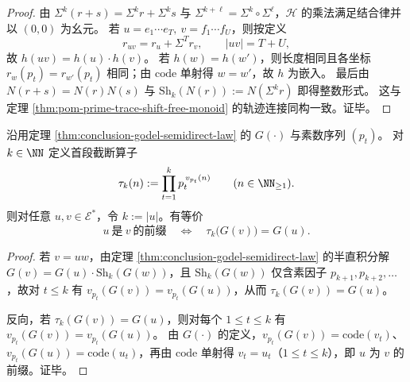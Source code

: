\begin{proof}
由 \(\Sigma^k(r+s)=\Sigma^k r+\Sigma^k s\) 与 \(\Sigma^{k+\ell}=\Sigma^k\circ\Sigma^\ell\)，\(\mathcal H\) 的乘法满足结合律并以 \((0,0)\) 为幺元。
若 \(u=e_1\cdots e_T,\ v=f_1\cdots f_U\)，则按定义
\[
r_{uv}=r_u+\Sigma^T r_v,\qquad |uv|=T+U,
\]
故 \(h(uv)=h(u)\cdot h(v)\)。
若 \(h(w)=h(w')\)，则长度相同且各坐标 \(r_w(p_t)=r_{w'}(p_t)\) 相同；由 \(\mathrm{code}\) 单射得 \(w=w'\)，故 \(h\) 为嵌入。
最后由 \(N(r+s)=N(r)N(s)\) 与 \(\mathrm{Sh}_k(N(r)):=N(\Sigma^k r)\) 即得整数形式。
这与定理 \ref{thm:pom-prime-trace-shift-free-monoid} 的轨迹连接同构一致。证毕。
\end{proof}


\begin{theorem}[前缀关系的纯算术判据]\label{thm:conclusion-godel-prefix-arithmetic-criterion}
沿用定理 \ref{thm:conclusion-godel-semidirect-law} 的 \(G(\cdot)\) 与素数序列 \((p_t)\)。
对 \(k\in\NN\) 定义首段截断算子
\[
\tau_k(n):=\prod_{t=1}^{k} p_t^{\,v_{p_t}(n)}\qquad(n\in\NN_{\ge 1}).
\]
则对任意 \(u,v\in\mathcal E^\ast\)，令 \(k:=|u|\)。有等价
\[
u\ \text{是}\ v\ \text{的前缀}
\quad\Longleftrightarrow\quad
\tau_k\!\bigl(G(v)\bigr)=G(u).
\]
\end{theorem}
\begin{proof}
若 \(v=uw\)，由定理 \ref{thm:conclusion-godel-semidirect-law} 的半直积分解
\(
G(v)=G(u)\cdot \mathrm{Sh}_{k}(G(w))
\)，且 \(\mathrm{Sh}_{k}(G(w))\) 仅含素因子 \(p_{k+1},p_{k+2},\dots\)，故对 \(t\le k\) 有
\(
v_{p_t}(G(v))=v_{p_t}(G(u))
\)，从而 \(\tau_k(G(v))=G(u)\)。
\par
反向，若 \(\tau_k(G(v))=G(u)\)，则对每个 \(1\le t\le k\) 有
\(
v_{p_t}(G(v))=v_{p_t}(G(u))
\)。
由 \(G(\cdot)\) 的定义，\(v_{p_t}(G(v))=\mathrm{code}(v_t)\)、\(v_{p_t}(G(u))=\mathrm{code}(u_t)\)，再由 \(\mathrm{code}\) 单射得 \(v_t=u_t\)（\(1\le t\le k\)），即 \(u\) 为 \(v\) 的前缀。证毕。
\end{proof}

